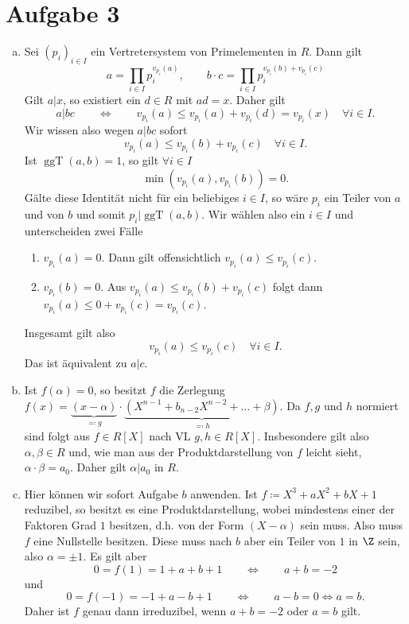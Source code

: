 \documentclass{article}
\newcommand{\ggT}{\operatorname{ggT}}
\begin{document}
    \section*{Aufgabe 3}
    \begin{enumerate}[(a)]
        \item Sei $(p_i)_{i\in I}$ ein Vertretersystem von Primelementen in $R$. Dann gilt
        \[
            a = \prod_{i\in I} p_i^{v_{p_i}(a)},\qquad b \cdot c = \prod_{i\in I} p_i^{v_{p_i}(b) + v_{p_i}(c)}  
        \]
        Gilt $a | x$, so existiert ein $d\in R$ mit $ad = x$. Daher gilt
        \[
          a | bc \qquad \Leftrightarrow \qquad v_{p_i}(a) \leq v_{p_i}(a) + v_{p_i}(d) = v_{p_i}(x) \quad \forall i\in I.  
        \]
        Wir wissen also wegen $a | bc$ sofort
        \[
          v_{p_i}(a) \leq v_{p_i}(b) + v_{p_i}(c) \quad \forall i\in I.  
        \]
        Ist $\ggT(a,b) = 1$, so gilt $\forall i \in I$
        \[
            \min(v_{p_i}(a), v_{p_i}(b)) = 0.
        \]
        Gälte diese Identität nicht für ein beliebiges $i\in I$, so wäre $p_i$ ein Teiler von $a$ und von $b$ und somit $p_i | \ggT(a,b)$.
        Wir wählen also ein $i\in I$ und unterscheiden zwei Fälle
        \begin{enumerate}[(1.)]
            \item $v_{p_i}(a) = 0$. Dann gilt offensichtlich $v_{p_i}(a) \leq v_{p_i}(c)$.
            \item $v_{p_i}(b) = 0$. Aus $v_{p_i}(a) \leq v_{p_i}(b) + v_{p_i}(c)$ folgt dann $v_{p_i}(a) \leq 0 + v_{p_i}(c) = v_{p_i}(c)$.
        \end{enumerate}
        Insgesamt gilt also
        \[
          v_{p_i}(a) \leq v_{p_i}(c) \quad \forall i\in I.
        \]
        Das ist äquivalent zu $a | c$.
        \item Ist $f(\alpha) = 0$, so besitzt $f$ die Zerlegung $f(x) = \underbrace{(x - \alpha)}_{\eqqcolon g} \cdot \underbrace{(X^{n-1} + b_{n-2}X^{n-2} + \dots + \beta)}_{\eqqcolon h}$. Da $f, g$ und $h$ normiert sind folgt aus $f \in R[X]$ nach VL $g, h \in R[X]$. Insbesondere gilt also $\alpha, \beta\in R$ und, wie man aus der Produktdarstellung von $f$ leicht sieht, $\alpha \cdot \beta = a_0$. Daher gilt $\alpha | a_0$ in $R$.
        \item Hier können wir sofort Aufgabe $b$ anwenden. Ist $f \coloneqq X^3 + aX^2 + bX + 1$ reduzibel, so besitzt es eine Produktdarstellung, wobei mindestens einer der Faktoren Grad $1$ besitzen, d.h. von der Form $(X - \alpha)$ sein muss. Also muss $f$ eine Nullstelle besitzen. Diese muss nach $b$ aber ein Teiler von $1$ in $\Z$ sein, also $\alpha = \pm 1$. Es gilt aber
        \[
            0 = f(1) = 1 + a + b + 1 \qquad \Leftrightarrow \qquad a + b = -2
        \] und
        \[
            0 = f(-1) = -1 + a - b + 1 \qquad \Leftrightarrow \qquad a - b = 0 \Leftrightarrow a = b.    
        \]
        Daher ist $f$ genau dann irreduzibel, wenn $a + b = -2$ oder $a = b$ gilt.
    \end{enumerate}
\end{document}
